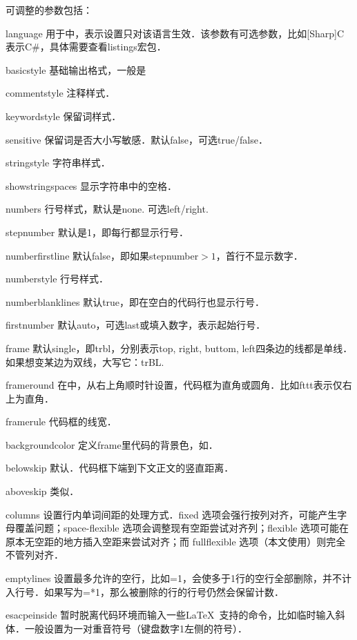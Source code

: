 可调整的参数包括：
\begin{para}
\item[language] 用于中，表示设置只对该语言生效．该参数有可选参数，比如[Sharp]C表示C\#，具体需要查看listings宏包．
\item[basicstyle] 基础输出格式，一般是
\item[commentstyle] 注释样式．
\item[keywordstyle] 保留词样式．
\item[sensitive] 保留词是否大小写敏感．默认false，可选true/false．
\item[stringstyle] 字符串样式．
\item[showstringspaces] 显示字符串中的空格．
\item[numbers] 行号样式，默认是none. 可选left/right.
\item[stepnumber] 默认是1，即每行都显示行号．
\item[numberfirstline] 默认false，即如果stepnumber$>1$，首行不显示数字．
\item[numberstyle] 行号样式．
\item[numberblanklines] 默认true，即在空白的代码行也显示行号．
\item[firstnumber] 默认auto，可选last或填入数字，表示起始行号．
\item[frame] 默认single，即trbl，分别表示top, right, buttom, left四条边的线都是单线．如果想变某边为双线，大写它：trBL.
\item[frameround] 在中，从右上角顺时针设置，代码框为直角或圆角．比如fttt表示仅右上为直角．
\item[framerule] 代码框的线宽．
\item[backgroundcolor] 定义frame里代码的背景色，如．
\item[belowskip] 默认．代码框下端到下文正文的竖直距离．
\item[aboveskip] 类似．
\item[columns] 设置行内单词间距的处理方式．fixed 选项会强行按列对齐，可能产生字母覆盖问题；space-flexible 选项会调整现有空距尝试对齐列；flexible 选项可能在原本无空距的地方插入空距来尝试对齐；而 fullflexible 选项（本文使用）则完全不管列对齐．
\item[emptylines] 设置最多允许的空行，比如=1，会使多于1行的空行全部删除，并不计入行号．如果写为=*1，那么被删除的行的行号仍然会保留计数．
\item[esacpeinside] 暂时脱离代码环境而输入一些\LaTeX\ 支持的命令，比如临时输入斜体．一般设置为一对重音符号（键盘数字1左侧的符号）．
\end{para}

